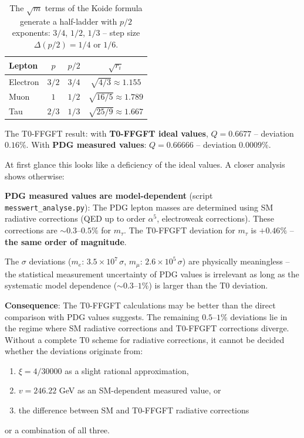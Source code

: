 \begin{table}[htbp]
\centering\small
\begin{tabular}{lccc}
\toprule
\textbf{Lepton} & $p$ & $p/2$ & $\sqrt{r_i}$ \\
\midrule
Electron & $3/2$ & $3/4$ & $\sqrt{4/3} \approx 1.155$ \\
Muon     & $1$   & $1/2$ & $\sqrt{16/5} \approx 1.789$ \\
Tau      & $2/3$ & $1/3$ & $\sqrt{25/9} \approx 1.667$ \\
\bottomrule
\end{tabular}
\caption{The $\sqrt{m}$ terms of the Koide formula generate a
half-ladder with $p/2$ exponents: $3/4$, $1/2$, $1/3$ --
step size $\Delta(p/2) = 1/4$ or $1/6$.}
\label{tab:koide_p_en}
\end{table}

The T0-FFGFT result: with \textbf{T0-FFGFT ideal values}, $Q = 0.6677$ -- deviation $0.16\%$. With \textbf{PDG measured values}: $Q = 0.66666$ -- deviation $0.0009\%$.

At first glance this looks like a deficiency of the ideal values.
A closer analysis shows otherwise:

\textbf{PDG measured values are model-dependent} (script \texttt{messwert\_analyse.py}):
The PDG lepton masses are determined using SM radiative corrections
(QED up to order $\alpha^5$, electroweak corrections). These corrections
are $\sim 0.3$--$0.5\%$ for $m_\tau$. The T0-FFGFT deviation for
$m_\tau$ is $+0.46\%$ -- \textbf{the same order of magnitude}.

The $\sigma$ deviations ($m_e$: $3.5 \times 10^{7}\,\sigma$,
$m_\mu$: $2.6 \times 10^5\,\sigma$) are physically meaningless
-- the statistical measurement uncertainty of PDG values is irrelevant
as long as the systematic model dependence ($\sim 0.3$--$1\%$) is
larger than the T0 deviation.

\textbf{Consequence}: The T0-FFGFT calculations may be better than
the direct comparison with PDG values suggests. The remaining $0.5$--$1\%$
deviations lie in the regime where SM radiative corrections and
T0-FFGFT corrections diverge. Without a complete T0 scheme for
radiative corrections, it cannot be decided whether the deviations
originate from:
\begin{enumerate}
    \item $\xi = 4/30000$ as a slight rational approximation,
    \item $v = 246.22$ GeV as an SM-dependent measured value, or
    \item the difference between SM and T0-FFGFT radiative corrections
\end{enumerate}
or a combination of all three.

